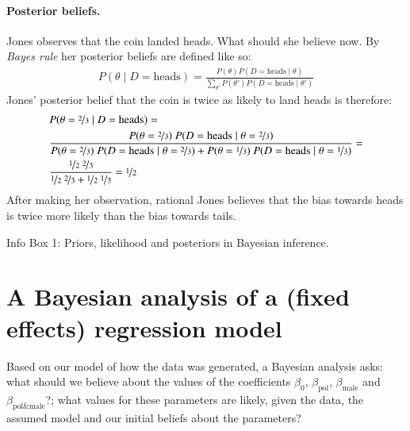\documentclass[nobib]{tufte-handout}
\begin{document}
\begin{InfoBox}[t]
{\begin{minipage}{1.0\textwidth}
    \paragraph{Posterior beliefs.} Jones observes that the coin landed heads. What should she
    believe now. By \emph{Bayes rule} her posterior beliefs are defined like so:
    \begin{align*}
      P(\theta \mid D = \text{heads}) = \frac{P(\theta) P(D = \text{heads} \mid \theta)}{\sum_{\theta'}P(\theta') P(D = \text{heads} \mid \theta')}
    \end{align*}
    Jones' posterior belief that the coin is twice as likely to land heads is therefore:
    \begin{align*}
      & P(\theta = \nicefrac{2}{3} \mid D = \text{heads}) =  \\
      & \frac{P(\theta = \nicefrac{2}{3}) \ P(D = \text{heads} \mid \theta = \nicefrac{2}{3})}{P(\theta = \nicefrac{2}{3}) \ P(D = \text{heads} \mid \theta = \nicefrac{2}{3}) + P(\theta = \nicefrac{1}{3}) \ P(D = \text{heads} \mid \theta = \nicefrac{1}{3})} = \\
      & \frac{\nicefrac{1}{2} \ \nicefrac{2}{3}}{\nicefrac{1}{2} \ \nicefrac{2}{3} + \nicefrac{1}{2} \ \nicefrac{1}{3}} = \nicefrac{1}{2}
    \end{align*}
    After making her observation, rational Jones believes that the bias towards heads is twice
    more likely than the bias towards tails.
    
  \end{minipage} \par
  } \par
  \begin{center}
    Info Box 1: Priors, likelihood and posteriors in Bayesian inference.
  \end{center}
\end{InfoBox}


\section{A Bayesian analysis of a (fixed effects) regression model}

Based on our model of how the data was generated, a Bayesian analysis asks: what should we
believe about the values of the coefficients $\beta_0$, $\beta_{\text{pol}}$,
$\beta_{\text{male}}$ and $\beta_{\text{pol\&male}}$?; what values for these parameters are
likely, given the data, the assumed model and our initial beliefs about the parameters?
%
%
%
\end{document}

